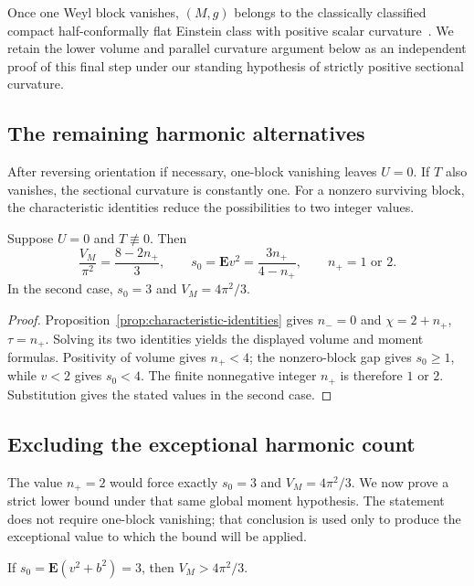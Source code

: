 Once one Weyl block vanishes, $(M,g)$ belongs to the classically
classified compact half-conformally flat Einstein class with positive
scalar curvature~\cite{Hitchin1981,FriedrichKurke1982,Obata1962}.
We retain the lower volume and parallel curvature argument below as an
independent proof of this final step under our standing hypothesis of
strictly positive sectional curvature.

\subsection{The remaining harmonic alternatives}

After reversing orientation if necessary, one-block vanishing leaves
$U=0$. If $T$ also vanishes, the sectional curvature is constantly one.
For a nonzero surviving block, the characteristic identities reduce the
possibilities to two integer values.

\begin{lemma}
\label{lem:one-block-alternatives}
Suppose $U=0$ and $T\not\equiv0$. Then
\[
 \frac{V_M}{\pi^2}=\frac{8-2n_+}{3},\qquad
 s_0=\mathbf E v^2=\frac{3n_+}{4-n_+},\qquad n_+=1\text{ or }2.
\]
In the second case, $s_0=3$ and $V_M=4\pi^2/3$.
\end{lemma}
\begin{proof}
Proposition~\ref{prop:characteristic-identities} gives $n_-=0$ and
$\chi=2+n_+$, $\tau=n_+$. Solving its two identities yields the displayed
volume and moment formulas. Positivity of volume gives $n_+<4$; the
nonzero-block gap gives $s_0\ge1$, while $v<2$ gives $s_0<4$.
The finite nonnegative integer $n_+$ is therefore $1$ or $2$.
Substitution gives the stated values in the second case.
\end{proof}

\subsection{Excluding the exceptional harmonic count}

The value $n_+=2$ would force exactly $s_0=3$ and $V_M=4\pi^2/3$.
We now prove a strict lower bound under that same global moment
hypothesis. The statement does not require one-block vanishing; that
conclusion is used only to produce the exceptional value to which the
bound will be applied.

\begin{proposition}
\label{prop:conditional-lower-volume}
If $s_0=\mathbf E(v^2+b^2)=3$, then $V_M>4\pi^2/3$.
\end{proposition}

